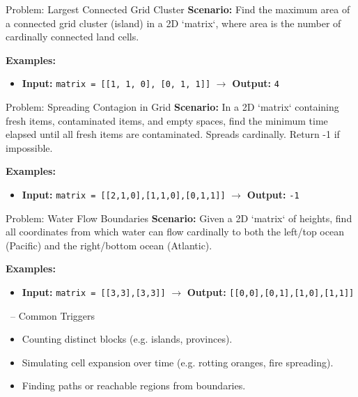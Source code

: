 \begin{frame}[fragile]{Problem: Largest Connected Grid Cluster}
  \textbf{Scenario:}
  Find the maximum area of a connected grid cluster (island) in a 2D `matrix`, where area is the number of cardinally connected land cells.
  
  \vspace{0.3cm}
  \textbf{Examples:}
  \begin{itemize}
    \item \textbf{Input:} \texttt{matrix = [[1, 1, 0], [0, 1, 1]]} $\rightarrow$ \textbf{Output:} \texttt{4}
  \end{itemize}
\end{frame}

\begin{frame}[fragile]{Problem: Spreading Contagion in Grid}
  \textbf{Scenario:}
  In a 2D `matrix` containing fresh items, contaminated items, and empty spaces, find the minimum time elapsed until all fresh items are contaminated. Spreads cardinally. Return -1 if impossible.
  
  \vspace{0.3cm}
  \textbf{Examples:}
  \begin{itemize}
    \item \textbf{Input:} \texttt{matrix = [[2,1,0],[1,1,0],[0,1,1]]} $\rightarrow$ \textbf{Output:} \texttt{-1}
  \end{itemize}
\end{frame}

\begin{frame}[fragile]{Problem: Water Flow Boundaries}
  \textbf{Scenario:}
  Given a 2D `matrix` of heights, find all coordinates from which water can flow cardinally to both the left/top ocean (Pacific) and the right/bottom ocean (Atlantic).
  
  \vspace{0.3cm}
  \textbf{Examples:}
  \begin{itemize}
    \item \textbf{Input:} \texttt{matrix = [[3,3],[3,3]]} $\rightarrow$ \textbf{Output:} \texttt{[[0,0],[0,1],[1,0],[1,1]]}
  \end{itemize}
\end{frame}

\begin{frame}{\secname\ -- Common Triggers}
  \begin{itemize}
    \item Counting distinct blocks (e.g. islands, provinces).
        \item Simulating cell expansion over time (e.g. rotting oranges, fire spreading).
        \item Finding paths or reachable regions from boundaries.
  \end{itemize}
\end{frame}
